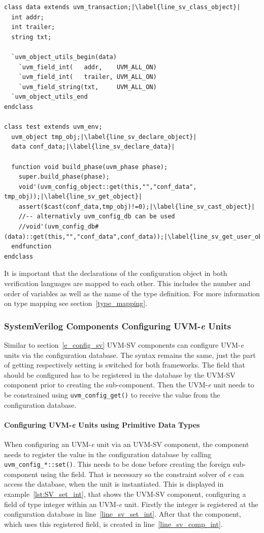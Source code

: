 \lstset{language=SystemVerilog, numbers = left, escapechar=|, breaklines=true}
\begin{lstlisting}[frame=htrbl, caption={SystemVerilog: getting a configuration object}, label={lst:SV_get_object}]
class data extends uvm_transaction;|\label{line_sv_class_object}|
  int addr;
  int trailer;
  string txt;
  
  `uvm_object_utils_begin(data)
    `uvm_field_int(   addr,    UVM_ALL_ON)
    `uvm_field_int(   trailer, UVM_ALL_ON)
    `uvm_field_string(txt,     UVM_ALL_ON)
  `uvm_object_utils_end
endclass

class test extends uvm_env;
  uvm_object tmp_obj;|\label{line_sv_declare_object}|
  data conf_data;|\label{line_sv_declare_data}|
  
  function void build_phase(uvm_phase phase);
    super.build_phase(phase);
    void'(uvm_config_object::get(this,"","conf_data", tmp_obj));|\label{line_sv_get_object}|
    assert($cast(conf_data,tmp_obj)!=0);|\label{line_sv_cast_object}|
    //-- alternativly uvm_config_db can be used
    //void'(uvm_config_db#(data)::get(this,"","conf_data",conf_data));|\label{line_sv_get_user_object}|
  endfunction
endclass
\end{lstlisting}
It is important that the declarations of the configuration object in both verification languages are mapped to each
other. This includes the number and order of variables as well as the name of the type definition. For more information
on type mapping see section~\ref{type_mapping}.

\subsubsection{SystemVerilog Components Configuring UVM-\textit{e} Units}
Similar to section~\ref{e_config_sv} UVM-SV components can configure UVM-\textit{e} units via the
configuration database. The syntax remains the same, just the part of getting respectively setting is switched for both
frameworks. The field that should be configured has to be registered in the database by the UVM-SV
component prior to creating the sub-component. Then the UVM-\textit{e} unit needs to be constrained using
\lstinline$uvm_config_get()$ to receive the value from the configuration database.

\paragraph{Configuring UVM-\textit{e} Units using Primitive Data Types}
When configuring an UVM-\textit{e} unit via an UVM-SV component, the component needs to register the value in
the configuration database by calling \lstinline$uvm_config_*::set()$. This needs to be
done before creating the foreign sub-component using the field. That is necessary so the constraint solver of
\textit{e} can access the database, when the unit is instantiated. This is displayed in example~\ref{lst:SV_set_int},
that shows the UVM-SV component, configuring a field of type integer within an UVM-\textit{e} unit. Firstly
the integer is registered at the configuration database in line~\ref{line_sv_set_int}. After that the component, which uses this registered field, is created in
line~\ref{line_sv_comp_int}.

